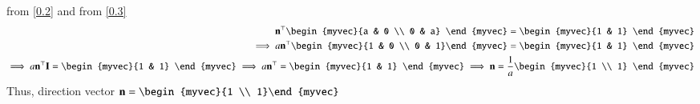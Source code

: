 \documentclass[journal]{IEEEtran}
\begin{document}
		from \eqref{0.2} and from \eqref{0.3}
		\begin{align}
		\vec{n}^\top\begin{myvec}{a & 0 \\ 0 & a} \end{myvec} = \begin{myvec}{1 & 1} \end{myvec} \\
		\implies a\vec{n}^\top\begin{myvec}{1 & 0 \\ 0 & 1}\end{myvec} = \begin{myvec}{1 & 1} \end{myvec}\\
		\implies a\vec{n}^\top\vec{I} = \begin{myvec}{1 & 1} \end{myvec}
		\implies a\vec{n}^\top = \begin{myvec}{1 & 1} \end{myvec}
		\implies \vec{n} = \frac{1}{a}\begin{myvec}{1 \\ 1} \end{myvec}
		\end{align}
		Thus, direction vector $\vec{n} = \begin{myvec}{1 \\ 1}\end{myvec}$
		
\end{document}
